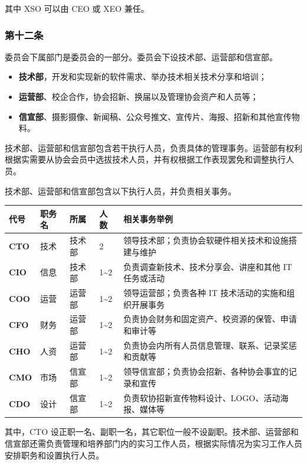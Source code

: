 \documentclass[
]{ctexart}
\begin{document}
其中 XSO 可以由 CEO 或 XEO 兼任。

\hypertarget{ux7b2cux5341ux4e8cux6761-ux59d4ux5458ux4f1aux4e0bux5c5eux673aux6784}{%
\subsubsection{第十二条}\label{ux7b2cux5341ux4e8cux6761-ux59d4ux5458ux4f1aux4e0bux5c5eux673aux6784}}

委员会下属部门是委员会的一部分。委员会下设技术部、运营部和信宣部。

\begin{itemize}
    \item \textbf{技术部}，开发和实现新的软件需求、举办技术相关技术分享和培训；
    \item \textbf{运营部}、校企合作，协会招新、换届以及管理协会资产和人员等；
    \item \textbf{信宣部}、摄影摄像、新闻稿、公众号推文、宣传片、海报、招新和其他宣传物料。
\end{itemize}

技术部、运营部和信宣部包含若干执行人员，负责具体的管理事务。运营部有权利根据实需要从协会会员中选拔技术人员，并有权根据工作表现罢免和调整执行人员。

技术部、运营部和信宣部包含以下执行人员，并负责相关事务。

{
\footnotesize
\begin{longtable}[]{@{}lllll@{}}
\toprule()
\textbf{代号} & \textbf{职务名} & \textbf{所属} & \textbf{人数} & \textbf{相关事务举例} \\
\midrule()
\endhead
\textbf{CTO} & 技术 & 技术部 & 2 &
领导技术部；负责协会软硬件相关技术和设施搭建与维护 \\
\textbf{CIO} & 信息 & 技术部 & 1\textasciitilde 2 &
负责调查新技术、技术分享会、讲座和其他 IT 任务或活动 \\
\textbf{COO} & 运营 & 运营部 & 1\textasciitilde 2 & 领导运营部；负责各种 IT
技术活动的实施和组织开展事务 \\
\textbf{CFO} & 财务 & 运营部 & 1\textasciitilde 2 &
负责协会财务和固定资产、校资源的保管、申请和审计等 \\
\textbf{CHO} & 人资 & 运营部 & 1\textasciitilde 2 &
负责协会内所有人员信息管理、联系、记录奖惩和贡献等 \\
\textbf{CMO} & 市场 & 信宣部 & 1\textasciitilde 2 &
领导信宣部；负责协会招新、各种协会事宜的记录和宣传 \\
\textbf{CDO} & 设计 & 信宣部 & 1\textasciitilde 2 &
负责软协招新宣传物料设计、LOGO、活动海报、媒体等 \\
\bottomrule()
\end{longtable}
}
其中，CTO
设正职一名、副职一名，其它职位一般不设副职。技术部、运营部和信宣部还需负责管理和培养部门内的实习工作人员，根据实际情况为实习工作人员安排职务和设置执行人员。
\end{document}
